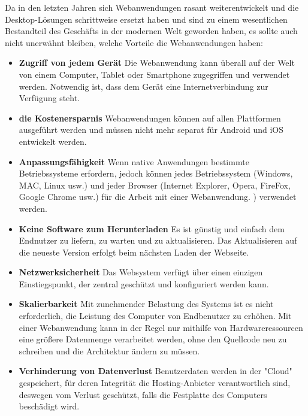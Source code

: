 Da in den letzten Jahren sich Webanwendungen rasant weiterentwickelt und die Desktop-Lösungen schrittweise ersetzt haben und sind zu einem wesentlichen Bestandteil des Geschäfts in der modernen Welt geworden haben, es sollte auch nicht unerwähnt bleiben, welche Vorteile die Webanwendungen haben:
\begin{itemize}
	\item \textbf{Zugriff von jedem Gerät} Die Webanwendung kann überall auf der Welt von einem Computer, Tablet oder Smartphone zugegriffen und verwendet werden. Notwendig ist, dass dem Gerät eine Internetverbindung zur Verfügung steht.

\item \textbf{die Kostenersparnis} Webanwendungen können auf allen Plattformen ausgeführt werden und müssen nicht mehr separat für Android und iOS entwickelt werden.

\item \textbf{Anpassungsfähigkeit} Wenn native Anwendungen bestimmte Betriebssysteme erfordern, jedoch können jedes Betriebssystem (Windows, MAC, Linux usw.) und jeder Browser (Internet Explorer, Opera, FireFox, Google Chrome usw.) für die Arbeit mit einer Webanwendung. ) verwendet werden.

\item \textbf{Keine Software zum Herunterladen} Es ist günstig und einfach dem Endnutzer zu liefern, zu warten und zu aktualisieren. Das Aktualisieren auf die neueste Version erfolgt beim nächsten Laden der Webseite.

\item \textbf{Netzwerksicherheit} Das Websystem verfügt über einen einzigen Einstiegspunkt, der zentral geschützt und konfiguriert werden kann.

\item \textbf{Skalierbarkeit} Mit zunehmender Belastung des Systems ist es nicht erforderlich, die Leistung des Computer von Endbenutzer zu erhöhen. Mit einer Webanwendung kann in der Regel nur mithilfe von Hardwareressourcen eine größere Datenmenge verarbeitet werden, ohne den Quellcode neu zu schreiben und die Architektur ändern zu müssen.

\item \textbf{Verhinderung von Datenverlust} Benutzerdaten werden in der "Cloud" gespeichert, für deren Integrität die Hosting-Anbieter verantwortlich sind, deswegen vom Verlust geschützt, falls die Festplatte des Computers beschädigt wird.
\end{itemize}

